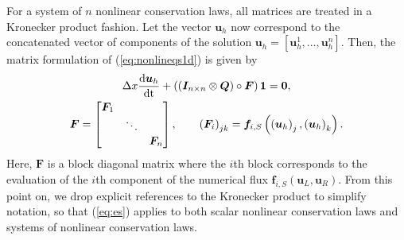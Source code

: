\documentclass[review]{siamart171218}
\theoremstyle{assumption}
\newcommand{\td}[2]{\frac{{\rm d}#1}{{\rm d}{\rm #2}}}
\newcommand{\LRp}[1]{\left( #1 \right)}
\begin{document}
For a system of $n$ nonlinear conservation laws, all matrices are treated in a Kronecker product fashion.  Let the vector $\bm{u}_h$ now correspond to the concatenated vector of components of the solution $\bm{u}_h = [\bm{u}_h^1, \ldots, \bm{u}_h^n]$.  Then, the matrix formulation of (\ref{eq:nonlineqs1d}) is given by
\begin{gather*}
\Delta x\td{\bm{u}_h}{t} + \LRp{\LRp{\bm{I}_{n \times n} \otimes \bm{Q} }\circ \bm{F}}\bm{1} = \bm{0},\\
\bm{F} = \begin{bmatrix}
\bm{F}_{1} & &\\
& \ddots &\\
&& \bm{F}_{n} \\
\end{bmatrix}, \qquad 
\LRp{\bm{F}_{i}}_{jk} = \bm{f}_{i,S}\LRp{\LRp{\bm{u}_h}_j, \LRp{\bm{u}_h}_k}.
\label{eq:essys}
\end{gather*}
Here, $\bm{F}$ is a block diagonal matrix where the $i$th block corresponds to the evaluation of the $i$th component of the numerical flux $\bm{f}_{i,S}(\bm{u}_L,\bm{u}_R)$.  From this point on, we drop explicit references to the Kronecker product to simplify notation, so that (\ref{eq:es}) applies to both scalar nonlinear conservation laws and systems of nonlinear conservation laws.  
\end{document}
